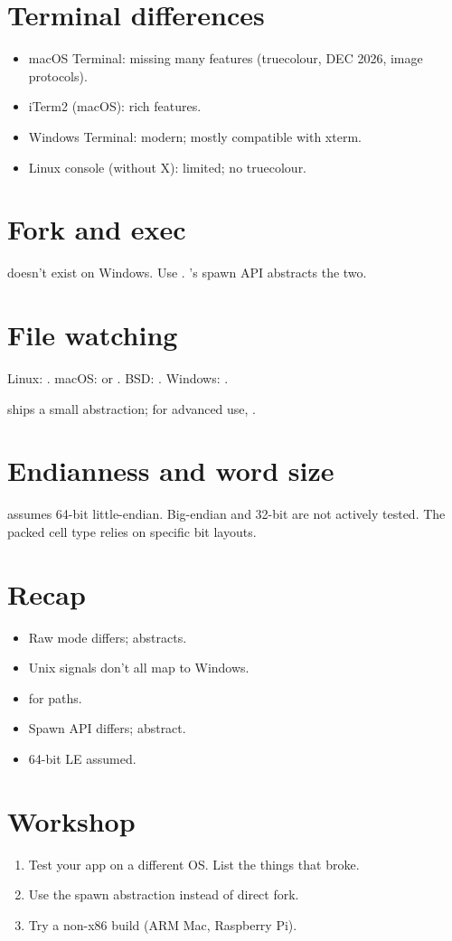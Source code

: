 \section{Terminal differences}

\begin{itemize}[leftmargin=*]
  \item macOS Terminal: missing many features (truecolour,
    DEC 2026, image protocols).
  \item iTerm2 (macOS): rich features.
  \item Windows Terminal: modern; mostly compatible with
    xterm.
  \item Linux console (without X): limited; no truecolour.
\end{itemize}

\section{Fork and exec}

 doesn't exist on Windows. Use
. \maya{}'s spawn API abstracts the
two.

\section{File watching}

Linux: . macOS:  or
. BSD: . Windows:
.

\maya{} ships a small abstraction; for advanced use,
.

\section{Endianness and word size}

\maya{} assumes 64-bit little-endian. Big-endian and 32-bit
are not actively tested. The packed cell type relies on
specific bit layouts.

\section{Recap}

\begin{recap}
\begin{itemize}[leftmargin=*]
  \item Raw mode differs; \maya{} abstracts.
  \item Unix signals don't all map to Windows.
  \item {} for paths.
  \item Spawn API differs; abstract.
  \item 64-bit LE assumed.
\end{itemize}
\end{recap}

\section*{Workshop}

\begin{enumerate}[leftmargin=*]
  \item Test your app on a different OS. List the things
    that broke.
  \item Use the spawn abstraction instead of direct fork.
  \item Try a non-x86 build (ARM Mac, Raspberry Pi).
\end{enumerate}
